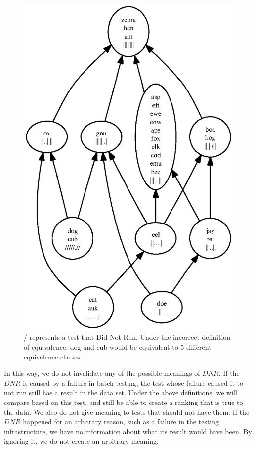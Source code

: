 \documentclass[11pt,twoside]{article}
\newcommand\dnr{\ensuremath{\mathit{DNR}}}
\theoremstyle{definition}
\begin{document}
\begin{figure}
\centering
\includegraphics[scale=0.75]{dnr.ps}
\caption{/ represents a test that Did Not Run. Under the incorrect definition of equivalence, dog and cub would be equivalent to 5 different equivalence classes}
\end{figure}

In this way, we do not invalidate any of the possible meanings of $\dnr$. If the $\dnr$ is caused by a failure in batch testing, the test whose failure caused it to not run still has a result in the data set. Under the above definitions, we will compare based on this test, and still be able to create a ranking that is true to the data. We also do not give meaning to tests that should not have them. If the $\dnr$ happened for an arbitrary reason, such as a failure in the testing infrastructure, we have no information about what its result would have been. By ignoring it, we do not create an arbitrary meaning. 
\end{document}
